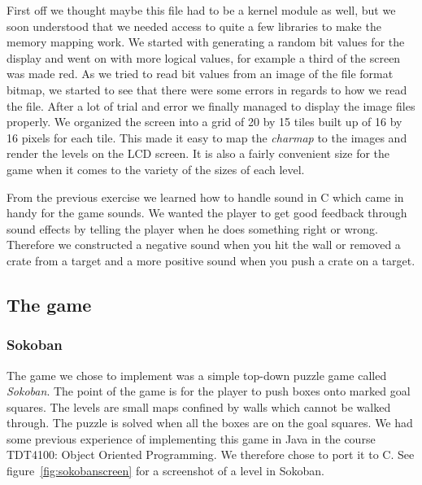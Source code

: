 \documentclass[a4paper,11pt]{article}
\begin{document}
First off we thought maybe this file had to be a kernel module as well, but we soon understood that we needed access to quite a few libraries to make the memory mapping work. We started with generating a random bit values for the display and went on with more logical values, for example a third of the screen was made red. As we tried to read bit values from an image of the file format bitmap, we started to see that there were some errors in regards to how we read the file. After a lot of trial and error we finally managed to display the image files properly. We organized the screen into a grid of 20 by 15 tiles built up of 16 by 16 pixels for each tile. This made it easy to map the \textit{charmap} to the images and render the levels on the LCD screen. It is also a fairly convenient size for the game when it comes to the variety of the sizes of each level.

From the previous exercise we learned how to handle sound in C which came in handy for the game sounds. We wanted the player to get good feedback through sound effects by telling the player when he does something right or wrong. Therefore we constructed a negative sound when you hit the wall or removed a crate from a target and a more positive sound when you push a crate on a target. 

\subsection{The game}
\subsubsection{Sokoban}
The game we chose to implement was a simple top-down puzzle game called \textit{Sokoban}\cite{sokoban}. The point of the game is for the player to push boxes onto marked goal squares. The levels are small maps confined by walls which cannot be walked through. The puzzle is solved when all the boxes are on the goal squares. We had some previous experience of implementing this game in Java in the course TDT4100: Object Oriented Programming. We therefore chose to port it to C. See figure~\ref{fig:sokobanscreen} for a screenshot of a level in Sokoban.
\end{document}

